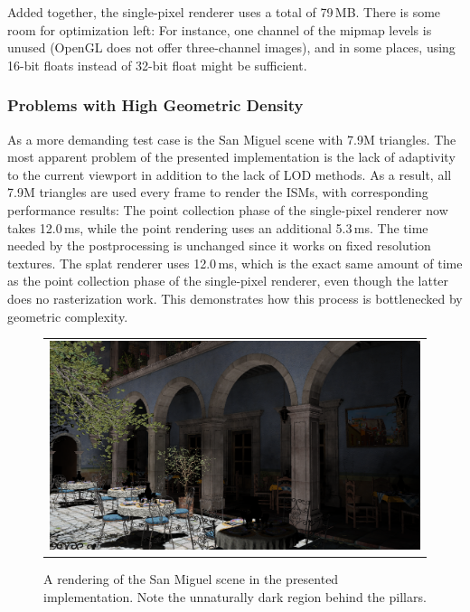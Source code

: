 Added together, the single-pixel renderer uses a total of 79\,MB. There is some room for optimization left: For instance, one channel of the mipmap levels is unused (OpenGL does not offer three-channel images), and in some places, using 16-bit floats instead of 32-bit float might be sufficient.


\subsubsection{Problems with High Geometric Density}
\label{sec:results:ism:densityProblems}

As a more demanding test case is the San Miguel scene with 7.9M triangles. The most apparent problem of the presented implementation is the lack of adaptivity to the current viewport in addition to the lack of LOD methods. As a result, all 7.9M triangles are used every frame to render the ISMs, with corresponding performance results: The point collection phase of the single-pixel renderer now takes 12.0\,ms, while the point rendering uses an additional 5.3\,ms. The time needed by the postprocessing is unchanged since it works on fixed resolution textures. The splat renderer uses 12.0\,ms, which is the exact same amount of time as the point collection phase of the single-pixel renderer, even though the latter does no rasterization work. This demonstrates how this process is bottlenecked by geometric complexity.


\begin{figure}[htb]
\centering
  \begin{tabular}{@{}c@{}}
    \includegraphics[width=1.0\textwidth]{screenshots/san_miguel_wide} \\
  \end{tabular}
  \caption{A rendering of the San Miguel scene in the presented implementation. Note the unnaturally dark region behind the pillars.}
  \label{fig:results:san_miguel_wide}
\end{figure}

